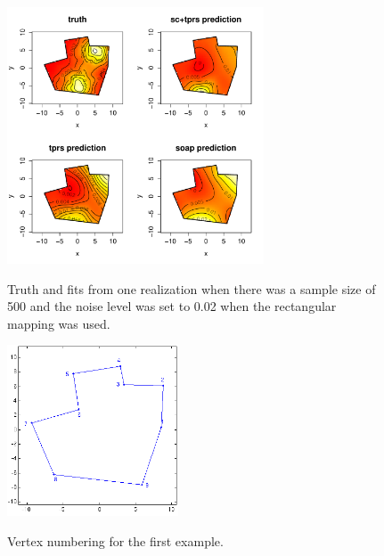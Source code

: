 \documentclass[a4paper,10pt]{amsart}
\begin{document}
\begin{figure}
\centering
\includegraphics[width=3in]{figs-otherdomains/fig9-rect-real.pdf} \\
\caption{Truth and fits from one realization when there was a sample size of 500 and the noise level was set to 0.02 when the rectangular mapping was used. }
\label{fig9-rect-real}
\end{figure}

\begin{figure}
\centering
\includegraphics[width=2in]{figs-otherdomains/fig9-numbered.png} \\
\caption{Vertex numbering for the first example.}
\label{fig9-numbered}
\end{figure}
\end{document}
